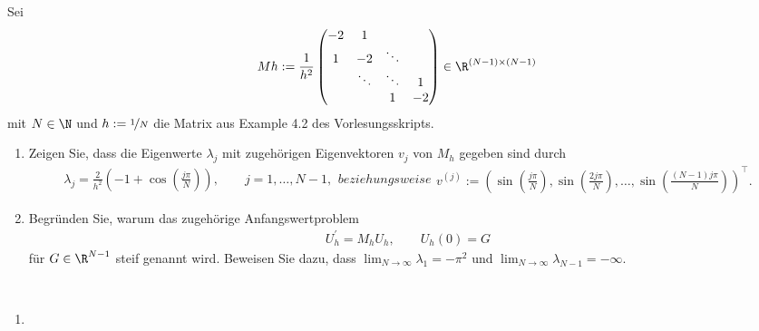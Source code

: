 \begin{exercise}
Sei
\begin{align}
  Mh := \frac{1}{h^2}\begin{pmatrix}
    -2 & 1 & &  \\
    1 & -2 & \ddots & \\
    & \ddots & \ddots & 1 \\
    & & 1 & -2
  \end{pmatrix}
  \in \R^{(N-1)\times (N-1)}
\end{align}
mit $N \in \N$ und $h := \nicefrac{1}{N}$ die Matrix aus Example 4.2 des Vorlesungsskripts.
\begin{enumerate}[label = \textbf{\alph*)}]
  \item Zeigen Sie, dass die Eigenwerte $\lambda_j$ mit zugehörigen Eigenvektoren $v_j$
  von $M_h$ gegeben sind durch
  \begin{subequations}
  \begin{align}\label{ew}
    \lambda_j = \frac{2}{h^2}\left(-1 + \cos\left(\frac{j\pi}{N}\right)\right),
    \qquad j = 1,\dots,N-1,
  \end{align}
  beziehungsweise
  \begin{align}
    v^{(j)} := \left(\sin\left(\frac{j\pi}{N}\right), \sin\left(\frac{2j\pi}{N}\right),\dots,
    \sin\left(\frac{(N-1)j\pi}{N}\right)\right)^{\top}.
  \end{align}
  \end{subequations}
  \item Begründen Sie, warum das zugehörige Anfangswertproblem
  \begin{align}\label{awp}
    U_h^{\prime} = M_hU_h, \qquad U_h(0) = G
  \end{align}
  für $G \in \R^{N-1}$ steif genannt wird. Beweisen Sie dazu, dass
  $\lim_{N \rightarrow \infty} \lambda_1 = -\pi^2$ und
  $\lim_{N \rightarrow \infty} \lambda_{N-1} = -\infty$.
\end{enumerate}
\end{exercise}
\begin{solution}
\leavevmode \\
\begin{enumerate}[label = \textbf{\alph*)}]
\item
\end{enumerate}
\end{solution}
